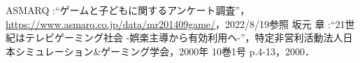 \documentclass[twocolumn,10pt,a4j]{ltjsarticle}
\begin{document}

\begin{thebibliography}{99}
 ASMARQ :``ゲームと子どもに関するアンケート調査''，\url{https://www.asmarq.co.jp/data/mr201409game/}，2022/8/19参照
 坂元 章 :``21世紀はテレビゲーミング社会 -娯楽主導から有効利用ヘ-''，特定非営利活動法人日本シミュレーション\&ゲーミング学会，2000年 10巻1号 p.4-13，2000．
\end{thebibliography}
\end{document}
